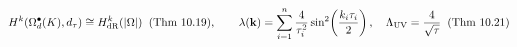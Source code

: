 \documentclass[preview]{standalone}
\begin{document}
\begin{align*}
\special{dvisvgm:raw <g id='unique000'>}H^k(\Omega_d^\bullet(K), d_\tau) \cong H_{\mathrm{dR}}^k(|\Omega|)\;\;(\text{Thm 10.19}), \qquad \lambda(\mathbf{k}) = \sum_{i=1}^n \frac{4}{\tau_i^2}\sin^2\!\left(\frac{k_i\tau_i}{2}\right), \quad \Lambda_{\mathrm{UV}} = \frac{4}{\sqrt{\tau}}\;\;(\text{Thm 10.21})\special{dvisvgm:raw </g>}
\end{align*}
\end{document}
